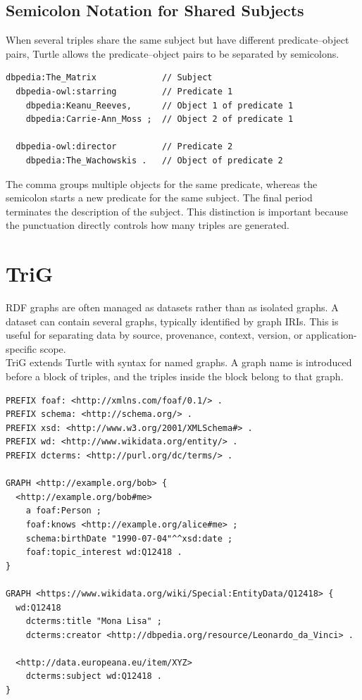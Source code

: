\documentclass{scrbook}
\begin{document}
	\subsection{Semicolon Notation for Shared Subjects}
	
	When several triples share the same subject but have different predicate--object pairs, Turtle allows the predicate--object pairs to be separated by semicolons.
	
	\begin{lstlisting}
dbpedia:The_Matrix             // Subject
  dbpedia-owl:starring         // Predicate 1
    dbpedia:Keanu_Reeves,      // Object 1 of predicate 1
    dbpedia:Carrie-Ann_Moss ;  // Object 2 of predicate 1
  
  dbpedia-owl:director         // Predicate 2
    dbpedia:The_Wachowskis .   // Object of predicate 2
	\end{lstlisting}
	
	The comma groups multiple objects for the same predicate, whereas the semicolon starts a new predicate for the same subject. The final period terminates the description of the subject. This distinction is important because the punctuation directly controls how many triples are generated.
	
	\section{TriG}
	
	RDF graphs are often managed as datasets rather than as isolated graphs. A dataset can contain several graphs, typically identified by graph IRIs. This is useful for separating data by source, provenance, context, version, or application-specific scope.\\
	
	TriG extends Turtle with syntax for named graphs. A graph name is introduced before a block of triples, and the triples inside the block belong to that graph.
	
	\begin{lstlisting}
PREFIX foaf: <http://xmlns.com/foaf/0.1/> .
PREFIX schema: <http://schema.org/> .
PREFIX xsd: <http://www.w3.org/2001/XMLSchema#> .
PREFIX wd: <http://www.wikidata.org/entity/> .
PREFIX dcterms: <http://purl.org/dc/terms/> .

GRAPH <http://example.org/bob> {
  <http://example.org/bob#me>
    a foaf:Person ;
    foaf:knows <http://example.org/alice#me> ;
    schema:birthDate "1990-07-04"^^xsd:date ;
    foaf:topic_interest wd:Q12418 .
}

GRAPH <https://www.wikidata.org/wiki/Special:EntityData/Q12418> {
  wd:Q12418
    dcterms:title "Mona Lisa" ;
    dcterms:creator <http://dbpedia.org/resource/Leonardo_da_Vinci> .

  <http://data.europeana.eu/item/XYZ>
    dcterms:subject wd:Q12418 .
}
	\end{lstlisting}
	
\end{document}
